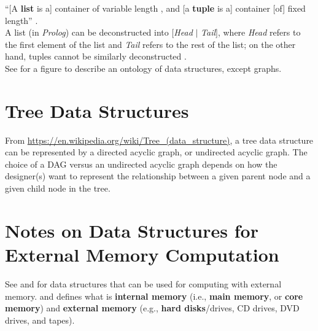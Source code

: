 ``[A {\bf list} is a] container of variable length , and [a {\bf tuple} is a] container [of] fixed length'' \cite[\S4.3 pp. 111]{Tate2010}. \\

A list (in {\it Prolog}) can be deconstructed into $[${\it Head} $|$ {\it Tail}$]$, where {\it Head} refers to the first element of the list and {\it Tail} refers to the rest of the list; on the other hand, tuples cannot be similarly deconstructed \cite[\S4.3 pp. 113]{Tate2010}. \\











See \cite[\S4, pp. 48]{Goldman2008} for a figure to describe an ontology of data structures, except graphs.


\section{Tree Data Structures}
\label{sec:TreeDataStructures}


From \url{https://en.wikipedia.org/wiki/Tree_(data_structure)}, a tree data structure can be represented by a directed acyclic graph, or undirected acyclic graph. The choice of a DAG versus an undirected acyclic graph depends on how the designer(s) want to represent the relationship between a given parent node and a given child node in the tree.














\section{Notes on Data Structures for External Memory Computation}
\label{sec:NotesOnDataStructuresForExternalMemoryComputation}

See \cite[\S14.3]{Goodrich2011} and \cite[\S15.3]{Goodrich2013} for data structures that can be used for computing with external memory. \cite[\S14.2.1]{Goodrich2011} and \cite[\S15.2.1]{Goodrich2013} defines what is {\bf internal memory} (i.e., {\bf main memory}, or {\bf core memory}) and {\bf external memory} (e.g., {\bf hard disks}/drives, CD drives, DVD drives, and tapes).





